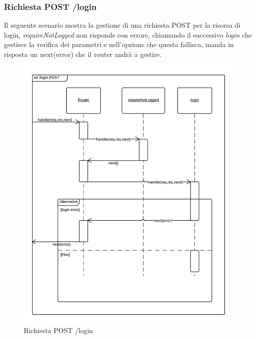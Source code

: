 \subsubsection{Richiesta POST /login} 
Il seguente scenario mostra la gestione di una richiesta POST per la risorsa di login, \emph{requireNotLogged} non risponde con errore, chiamando il successivo  \emph{login} che gestisce la verifica dei parametri e nell'opzione che questa fallisca, manda in risposta un next(error) che il router andrà a gestire.
\begin{figure}[H]
	\begin{center} 
		\includegraphics[scale=0.20]{scenari/login POST.png} 
		\caption{Richiesta POST /login}
	\end{center} 
\end{figure} 

\pagebreak
